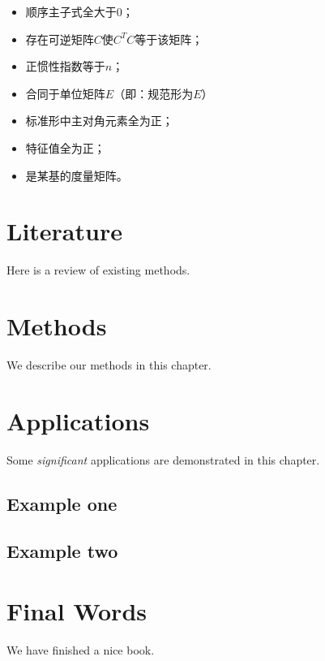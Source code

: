 \documentclass[]{book}
\providecommand{\tightlist}{%
  \setlength{\itemsep}{0pt}\setlength{\parskip}{0pt}}
\begin{document}
\begin{itemize}
\tightlist
\item
  顺序主子式全大于0；\\
\item
  存在可逆矩阵\(C\)使\(C^TC\)等于该矩阵；
\item
  正惯性指数等于\(n\)；
\item
  合同于单位矩阵\(E\)（即：规范形为\(E\)）
\item
  标准形中主对角元素全为正；
\item
  特征值全为正；
\item
  是某基的度量矩阵。
\end{itemize}

\chapter{Literature}\label{literature}

Here is a review of existing methods.

\chapter{Methods}\label{methods}

We describe our methods in this chapter.

\chapter{Applications}\label{applications}

Some \emph{significant} applications are demonstrated in this chapter.

\section{Example one}\label{example-one}

\section{Example two}\label{example-two}

\chapter{Final Words}\label{final-words}

We have finished a nice book.


\end{document}
